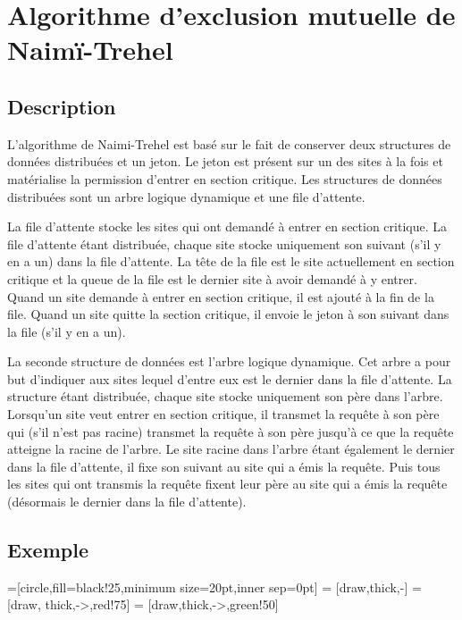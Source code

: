 
\chapter{Algorithme d'exclusion mutuelle de Naimï-Trehel}\label{naimi-trehel}


\section{Description}
L'algorithme de Naimi-Trehel \cite{naimi1996} est basé sur le fait de conserver deux structures de données distribuées et un jeton. Le jeton est présent sur un des sites à la fois et matérialise la permission d'entrer en section critique. Les structures de données distribuées sont un arbre logique dynamique et une file d'attente.

La file d'attente stocke les sites qui ont demandé à entrer en section critique. La file d'attente étant distribuée, chaque site stocke uniquement son suivant (s'il y en a un) dans la file d'attente. La tête de la file est le site actuellement en section critique et la queue de la file est le dernier site à avoir demandé à y entrer. Quand un site demande à entrer en section critique, il est ajouté à la fin de la file. Quand un site quitte la section critique, il envoie le jeton à son suivant dans la file (s'il y en a un).

La seconde structure de données est l'arbre logique dynamique. Cet arbre a pour but d'indiquer aux sites lequel d'entre eux est le dernier dans la file d'attente. La structure étant distribuée, chaque site stocke uniquement son père dans l'arbre. Lorsqu'un site veut entrer en section critique, il transmet la requête à son père qui (s'il n'est pas racine) transmet la requête à son père jusqu'à ce que la requête atteigne la racine de l'arbre. Le site racine dans l'arbre étant également le dernier dans la file d'attente, il fixe son suivant au site qui a émis la requête. Puis tous les sites qui ont transmis la requête fixent leur père au site qui a émis la requête (désormais le dernier dans la file d'attente).


\section{Exemple}

=[circle,fill=black!25,minimum size=20pt,inner sep=0pt]
 = [draw,thick,-]
 = [draw, thick,->,red!75]
 = [draw,thick,->,green!50]

